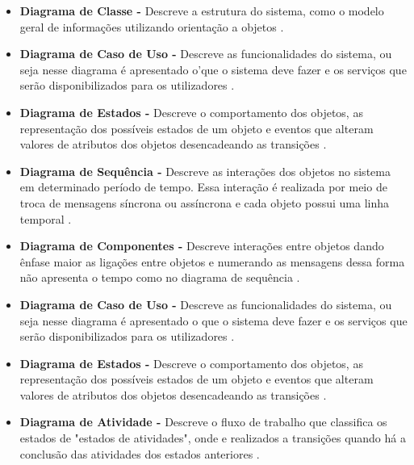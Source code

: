     \begin{itemize}
       \item \textbf{Diagrama de Classe -}
       Descreve a estrutura do sistema, como o modelo geral de informações utilizando orientação a objetos \cite{nunesfundamental}.
        
        \item \textbf{Diagrama de Caso de Uso -}
        Descreve as funcionalidades do sistema, ou seja nesse diagrama é apresentado o'que o sistema deve fazer e os serviços que serão disponibilizados para os utilizadores \cite{nunesfundamental}.
        
        \item \textbf{Diagrama de Estados -}
        Descreve o comportamento dos objetos, as representação dos possíveis estados de um objeto e eventos que alteram valores de atributos dos objetos desencadeando as transições \cite{uml}.
        
        \item \textbf{Diagrama de Sequência -}
        Descreve as interações dos objetos no sistema em determinado período de tempo. Essa interação é realizada por meio de troca de mensagens síncrona ou assíncrona e cada objeto possui uma linha temporal \cite{uml}.
        
        \item \textbf{Diagrama de Componentes -}
        Descreve interações entre objetos dando ênfase maior as ligações entre objetos e numerando as mensagens dessa forma não apresenta o tempo como no diagrama de sequência \cite{uml}.
        
        \item \textbf{Diagrama de Caso de Uso -}
        Descreve as funcionalidades do sistema, ou seja nesse diagrama é apresentado o que o sistema deve fazer e os serviços que serão disponibilizados para os utilizadores \cite{nunesfundamental}.
        
        \item \textbf{Diagrama de Estados -}
        Descreve o comportamento dos objetos, as representação dos possíveis estados de um objeto e eventos que alteram valores de atributos dos objetos desencadeando as transições \cite{uml}.
        
        \item \textbf{Diagrama de Atividade -}
        Descreve o fluxo de trabalho que classifica os estados de "estados de atividades", onde e realizados a transições quando há a conclusão das atividades dos estados anteriores \cite{uml}.
        

\end{itemize}
